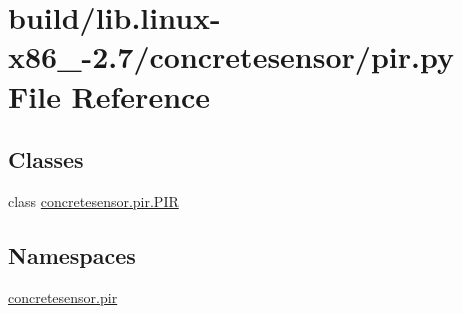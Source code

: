 \hypertarget{build_2lib_8linux-x86__64-2_87_2concretesensor_2pir_8py}{}\section{build/lib.linux-\/x86\+\_-\/2.7/concretesensor/pir.py File Reference}
\label{build_2lib_8linux-x86__64-2_87_2concretesensor_2pir_8py}
\subsection*{Classes}
\begin{DoxyCompactItemize}
\item 
class \hyperlink{classconcretesensor_1_1pir_1_1PIR}{concretesensor.\+pir.\+P\+I\+R}
\end{DoxyCompactItemize}
\subsection*{Namespaces}
\begin{DoxyCompactItemize}
\item 
 \hyperlink{namespaceconcretesensor_1_1pir}{concretesensor.\+pir}
\end{DoxyCompactItemize}

